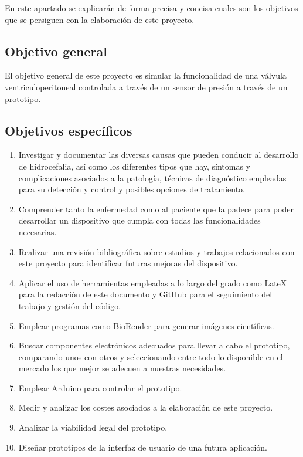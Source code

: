 
En este apartado  se explicarán de forma precisa y concisa cuales son los objetivos que se persiguen con la elaboración de este proyecto. 

\subsection{Objetivo general}
El objetivo general de este proyecto es simular la funcionalidad de una válvula ventriculoperitoneal controlada a través de un sensor de presión a través de un prototipo.
\subsection{Objetivos específicos}
\begin{enumerate}
    \item Investigar y documentar las diversas causas que pueden conducir al desarrollo de hidrocefalia, así como los diferentes tipos que hay, síntomas y complicaciones asociados a la patología, técnicas de diagnóstico empleadas para su detección y control y posibles opciones de tratamiento.
    \item Comprender tanto la enfermedad como al paciente que la padece para poder desarrollar un dispositivo que cumpla con todas las funcionalidades necesarias.
    \item Realizar una revisión bibliográfica sobre estudios y trabajos relacionados con este proyecto para identificar futuras mejoras del dispositivo.
    \item Aplicar el uso de herramientas empleadas a lo largo del grado como LateX para la redacción de este documento y GitHub para el seguimiento del trabajo y gestión del código.
    \item Emplear programas como BioRender para generar imágenes científicas.
    \item Buscar componentes electrónicos adecuados para llevar a cabo el prototipo, comparando unos con otros y seleccionando entre todo lo disponible en el mercado los que mejor se adecuen a nuestras necesidades.
    \item Emplear Arduino para controlar el prototipo.
    \item Medir y analizar los costes asociados a la elaboración de este proyecto.
    \item Analizar la viabilidad legal del prototipo.
    \item Diseñar prototipos de la interfaz de usuario de una futura aplicación.
\end{enumerate}








